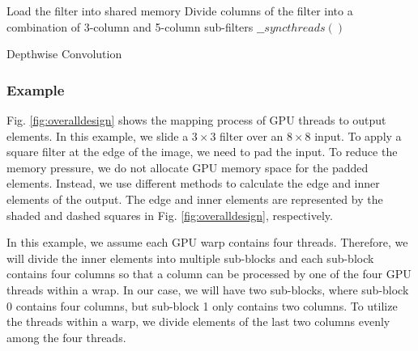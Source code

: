\begin{algorithm}[t!]
\small
	Load the filter into shared memory\;
	Divide columns of the filter into a combination of 3-column and 5-column sub-filters\;
	$\_\_syncthreads()$\;
	\caption{Depthwise Convolution}
	\label{algo:overalldesign}
\end{algorithm}

\subsubsection{Example} Fig. \ref{fig:overalldesign} shows the mapping process of GPU threads to output elements. In this example, we slide a $3
\times 3$ filter over an $8 \times 8$ input. To apply a square  filter at the edge of the image, we need to pad the input. To reduce the
memory pressure, we do not allocate GPU memory space for the padded elements. Instead, we use different methods to calculate the edge and
inner elements of the output. The edge and inner elements are represented by the shaded and dashed squares in Fig.
\ref{fig:overalldesign}, respectively.


In this example, we assume each GPU warp contains four threads. Therefore, we will divide the inner elements into multiple sub-blocks and
each sub-block contains four columns so that a column can be processed by one of the four GPU threads within a wrap. In our case, we will
have two sub-blocks, where sub-block 0 contains four columns, but sub-block 1 only contains two columns. To utilize the threads within a
warp, we divide elements of the last two columns evenly among the four threads.

